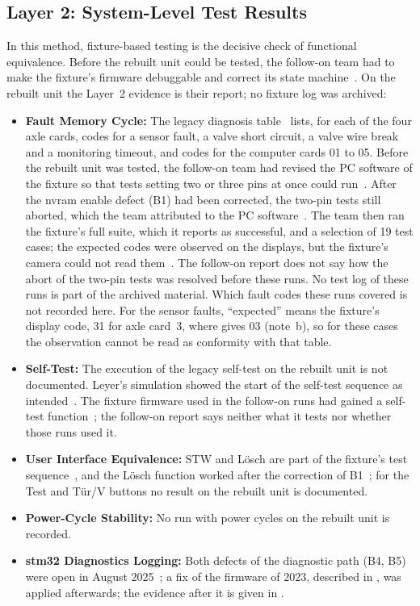 \subsection{Layer 2: System-Level Test Results}
\label{subsec:system_scenario_results}

In this method, fixture-based testing is the decisive check of functional equivalence. Before the rebuilt unit could be tested, the follow-on team had to make the fixture's firmware debuggable and correct its state machine~\cite[p.~10]{savchuk2025}. On the rebuilt unit the Layer~2 evidence is their report; no fixture log was archived:
\begin{itemize}
	\item \textbf{Fault Memory Cycle:} The legacy diagnosis table~\cite[Blatt~20/25]{rexroth1992wsp} lists, for each of the four axle cards, codes for a sensor fault, a valve short circuit, a valve wire break and a monitoring timeout, and codes for the computer cards 01 to 05. Before the rebuilt unit was tested, the follow-on team had revised the PC software of the fixture so that tests setting two or three pins at once could run~\cite[pp.~10--11]{savchuk2025}. After the \gls{nvram} enable defect (B1) had been corrected, the two-pin tests still aborted, which the team attributed to the PC software~\cite[p.~14]{savchuk2025}. The team then ran the fixture's full suite, which it reports as successful, and a selection of 19 test cases; the expected codes were observed on the displays, but the fixture's camera could not read them~\cite[p.~15]{savchuk2025}. The follow-on report does not say how the abort of the two-pin tests was resolved before these runs. No test log of these runs is part of the archived material. Which fault codes these runs covered is not recorded here. For the sensor faults, \enquote{expected} means the fixture's display code, 31 for axle card~3, where  gives 03 (note~b), so for these cases the observation cannot be read as conformity with that table.
	\item \textbf{Self-Test:} The execution of the legacy self-test on the rebuilt unit is not documented. Leyer's simulation showed the start of the self-test sequence as intended~\cite[Sec.~5.1.2]{leyer2023}. The fixture firmware used in the follow-on runs had gained a self-test function~\cite[p.~12]{savchuk2025}; the follow-on report says neither what it tests nor whether those runs used it.
	\item \textbf{User Interface Equivalence:} STW and Lösch are part of the fixture's test sequence~\cite{dolata2023}, and the Lösch function worked after the correction of B1~\cite[p.~14]{savchuk2025}; for the Test and Tür/V buttons no result on the rebuilt unit is documented.
	\item \textbf{Power-Cycle Stability:} No run with power cycles on the rebuilt unit is recorded.
	\item \textbf{\gls{stm32} Diagnostics Logging:} Both defects of the diagnostic path (B4, B5) were open in August 2025~\cite[pp.~19--22]{savchuk2025}; a fix of the firmware of 2023, described in , was applied afterwards; the evidence after it is given in .
\end{itemize}

